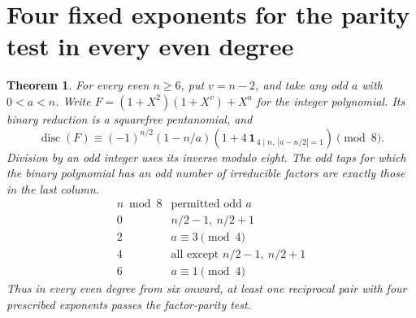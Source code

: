 \documentclass[11pt]{article}
\newtheorem{theorem}{Theorem}
\begin{document}
\section{Four fixed exponents for the parity test in every even degree}
\label{sec:symmetric-even-parity}
\begin{theorem}\label{thm:symmetric-even-parity}
For every even \(n\ge6\), put \(v=n-2\), and take any odd \(a\)
with \(0<a<n\). Write \(F=(1+X^2)(1+X^v)+X^a\) for the integer
polynomial. Its binary reduction is a squarefree pentanomial, and
\[
 \operatorname{disc}(F)\equiv(-1)^{n/2}(1-n/a)
       (1+4\,\mathbf1_{\,4\mid n,\ |a-n/2|=1})\pmod8 .
\]
Division by an odd integer uses its inverse modulo eight. The odd taps
for which the binary polynomial has an odd number of irreducible
factors are exactly those in the last column.
\[
\begin{array}{c|l}
 n\bmod8 & \text{permitted odd }a \\ \hline
 0 & n/2-1,\ n/2+1 \\
 2 & a\equiv3\pmod4 \\
 4 & \text{all except }n/2-1,\ n/2+1 \\
 6 & a\equiv1\pmod4
\end{array}
\]
Thus in every even degree from six onward, at least one reciprocal pair
with four prescribed exponents passes the factor-parity test.
\end{theorem}
\end{document}
